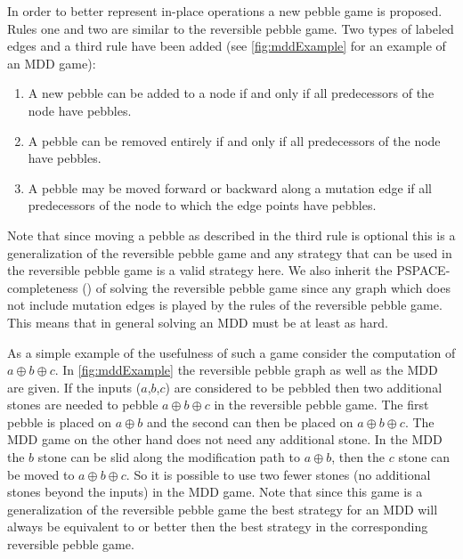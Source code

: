 In order to better represent in-place operations a new pebble game is proposed.
Rules one and two are similar to the reversible pebble game. Two types of labeled edges and a third rule
have been added (see \cref{fig:mddExample} for an example of an MDD game):


\begin{enumerate}

   \item A new pebble can be added to a node if and only if all predecessors of
     the node have pebbles.

   \item A pebble can be removed entirely if and only if all predecessors of
     the node have pebbles.

   \item A pebble may be moved forward or backward along a mutation edge if all
     predecessors of the node to which the edge points have pebbles.

\end{enumerate}

Note that since moving a pebble as described in the third rule is optional this
is a generalization of the reversible pebble game and any strategy that can be
used in the reversible pebble game is a valid strategy here. We also inherit
the PSPACE-completeness (\cite{chan13}) of solving the reversible pebble game
since any graph which does not include mutation edges is played by the rules of
the reversible pebble game. This means that in general solving an MDD must be
at least as hard.

As a simple example of the usefulness of such a game consider the computation
of $a \oplus b \oplus c$. In \cref{fig:mddExample} the reversible pebble graph
as well as the MDD are given. If the inputs ($a$,$b$,$c$) are considered to be
pebbled then two additional stones are needed to pebble $a \oplus b \oplus c$
in the reversible pebble game. The first pebble is placed on $a \oplus b$ and
the second can then be placed on $a \oplus b \oplus c$.  The MDD game on the
other hand does not need any additional stone. In the MDD the $b$ stone can be
slid along the modification path to $a \oplus b$, then the $c$ stone can be
moved to $a \oplus b \oplus c$. So it is possible to use two fewer stones (no
additional stones beyond the inputs) in the MDD game. Note that since this game
is a generalization of the reversible pebble game the best strategy for an MDD
will always be equivalent to or better then the best strategy in the
corresponding reversible pebble game.

